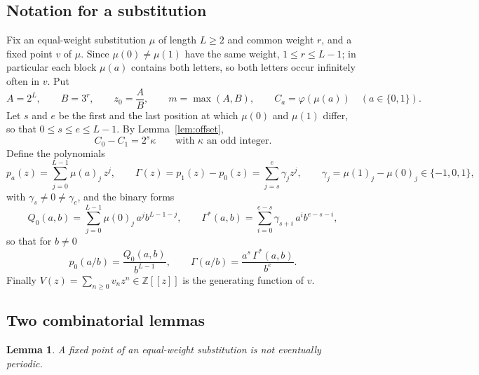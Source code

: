 \documentclass[11pt,reqno]{amsart}
\newtheorem{lemma}[theorem]{Lemma}
\theoremstyle{definition}
\theoremstyle{remark}
\newcommand{\Z}{\mathbb{Z}}
\begin{document}
\subsection{Notation for a substitution}\label{ssec:notation}
Fix an equal-weight substitution $\mu$ of length $L\ge 2$ and common weight
$r$, and a fixed point $v$ of $\mu$.  Since $\mu(0)\ne\mu(1)$ have the same
weight, $1\le r\le L-1$; in particular each block $\mu(a)$ contains both
letters, so both letters occur infinitely often in $v$.  Put
\[
  A=2^{L},\qquad B=3^{r},\qquad z_0=\frac{A}{B},\qquad
  m=\max(A,B),\qquad C_a=\varphi(\mu(a))\quad(a\in\{0,1\}).
\]
Let $s$ and $e$ be the first and the last position at which $\mu(0)$ and
$\mu(1)$ differ, so that $0\le s\le e\le L-1$.  By Lemma~\ref{lem:offset},
\begin{equation}\label{eq:kappa}
  C_0-C_1=2^{s}\kappa\qquad\text{with $\kappa$ an odd integer.}
\end{equation}
Define the polynomials
\[
  p_a(z)=\sum_{j=0}^{L-1}\mu(a)_j\,z^{j},\qquad
  \Gamma(z)=p_1(z)-p_0(z)=\sum_{j=s}^{e}\gamma_jz^{j},\qquad
  \gamma_j=\mu(1)_j-\mu(0)_j\in\{-1,0,1\},
\]
with $\gamma_s\ne 0\ne\gamma_e$, and the binary forms
\[
  Q_0(a,b)=\sum_{j=0}^{L-1}\mu(0)_j\,a^{j}b^{L-1-j},\qquad
  \Gamma^{*}(a,b)=\sum_{i=0}^{e-s}\gamma_{s+i}\,a^{i}b^{e-s-i},
\]
so that for $b\ne 0$
\begin{equation}\label{eq:forms}
  p_0(a/b)=\frac{Q_0(a,b)}{b^{L-1}},\qquad
  \Gamma(a/b)=\frac{a^{s}\,\Gamma^{*}(a,b)}{b^{e}} .
\end{equation}
Finally $V(z)=\sum_{n\ge 0}v_nz^{n}\in\Z[[z]]$ is the generating function of
$v$.

\subsection{Two combinatorial lemmas}

\begin{lemma}\label{lem:aperiodic}
A fixed point of an equal-weight substitution is not eventually periodic.
\end{lemma}
\end{document}
